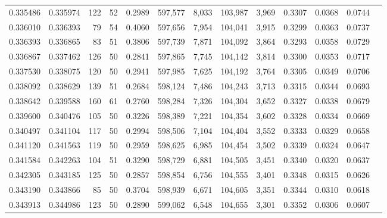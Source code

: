 \begin{tabular}{rrrrrrrrrrrrr}
0.335486 & 0.335974 &   122 &  52 &                                     0.2989 & 597,577 &   8,033 & 103,987 &   3,969 & 0.3307 & 0.0368 & 0.0744 \\
0.336010 & 0.336393 &    79 &  54 &                                     0.4060 & 597,656 &   7,954 & 104,041 &   3,915 & 0.3299 & 0.0363 & 0.0737 \\
0.336393 & 0.336865 &    83 &  51 &                                     0.3806 & 597,739 &   7,871 & 104,092 &   3,864 & 0.3293 & 0.0358 & 0.0729 \\
0.336867 & 0.337462 &   126 &  50 &                                     0.2841 & 597,865 &   7,745 & 104,142 &   3,814 & 0.3300 & 0.0353 & 0.0717 \\
0.337530 & 0.338075 &   120 &  50 &                                     0.2941 & 597,985 &   7,625 & 104,192 &   3,764 & 0.3305 & 0.0349 & 0.0706 \\
0.338092 & 0.338629 &   139 &  51 &                                     0.2684 & 598,124 &   7,486 & 104,243 &   3,713 & 0.3315 & 0.0344 & 0.0693 \\
0.338642 & 0.339588 &   160 &  61 &                                     0.2760 & 598,284 &   7,326 & 104,304 &   3,652 & 0.3327 & 0.0338 & 0.0679 \\
0.339600 & 0.340476 &   105 &  50 &                                     0.3226 & 598,389 &   7,221 & 104,354 &   3,602 & 0.3328 & 0.0334 & 0.0669 \\
0.340497 & 0.341104 &   117 &  50 &                                     0.2994 & 598,506 &   7,104 & 104,404 &   3,552 & 0.3333 & 0.0329 & 0.0658 \\
0.341120 & 0.341563 &   119 &  50 &                                     0.2959 & 598,625 &   6,985 & 104,454 &   3,502 & 0.3339 & 0.0324 & 0.0647 \\
0.341584 & 0.342263 &   104 &  51 &                                     0.3290 & 598,729 &   6,881 & 104,505 &   3,451 & 0.3340 & 0.0320 & 0.0637 \\
0.342305 & 0.343185 &   125 &  50 &                                     0.2857 & 598,854 &   6,756 & 104,555 &   3,401 & 0.3348 & 0.0315 & 0.0626 \\
0.343190 & 0.343866 &    85 &  50 &                                     0.3704 & 598,939 &   6,671 & 104,605 &   3,351 & 0.3344 & 0.0310 & 0.0618 \\
0.343913 & 0.344986 &   123 &  50 &                                     0.2890 & 599,062 &   6,548 & 104,655 &   3,301 & 0.3352 & 0.0306 & 0.0607 \\

\end{tabular}
